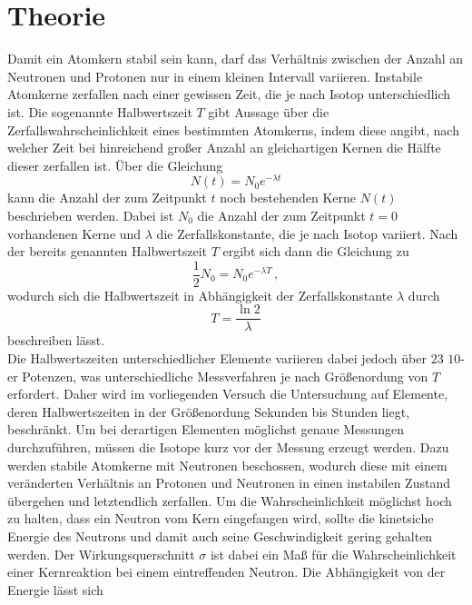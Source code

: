 \section{Theorie}
\label{sec:Theorie}

Damit ein Atomkern stabil sein kann, darf das Verhältnis zwischen der Anzahl an Neutronen und Protonen nur in einem 
kleinen Intervall variieren. Instabile Atomkerne zerfallen nach einer gewissen Zeit, die je nach Isotop unterschiedlich ist.
Die sogenannte Halbwertszeit $T$ gibt Aussage über die Zerfallswahrscheinlichkeit eines bestimmten Atomkerns, indem diese angibt,
nach welcher Zeit bei hinreichend großer Anzahl an gleichartigen Kernen die Hälfte dieser zerfallen ist. Über die Gleichung 
\begin{equation}
    N(t) = N_0 e^{-\lambda t}
    \label{eqn:nt}
\end{equation}
kann die Anzahl der zum Zeitpunkt $t$ noch bestehenden Kerne $N(t)$ beschrieben werden. Dabei ist $N_0$ die Anzahl der zum 
Zeitpunkt $t=0$ vorhandenen Kerne und $\lambda$ die Zerfallskonstante, die je nach Isotop variiert. Nach der bereits genannten 
Halbwertszeit $T$ ergibt sich dann die Gleichung zu 
\begin{equation}
    \frac{1}{2}N_0 = N_0 e^{-\lambda T}\,,
\end{equation}
wodurch sich die Halbwertszeit in Abhängigkeit der Zerfallskonstante $\lambda$ durch 
\begin{equation}
    T = \frac{\ln{2}}{\lambda}
    \label{eqn:T}
\end{equation}
beschreiben lässt.
\\
Die Halbwertszeiten unterschiedlicher Elemente variieren dabei jedoch über $23$ $10$-er Potenzen, was unterschiedliche 
Messverfahren je nach Größenordung von $T$ erfordert. Daher wird im vorliegenden Versuch die Untersuchung auf Elemente, deren 
Halbwertszeiten in der Größenordung Sekunden bis Stunden liegt, beschränkt. Um bei derartigen Elementen möglichst genaue Messungen
durchzuführen, müssen die Isotope kurz vor der Messung erzeugt werden. Dazu werden stabile Atomkerne mit Neutronen beschossen, 
wodurch diese mit einem veränderten Verhältnis an Protonen und Neutronen in einen instabilen Zustand übergehen und letztendlich
zerfallen. Um die Wahrscheinlichkeit möglichst hoch zu halten, dass ein Neutron vom Kern eingefangen wird, sollte die kinetsiche
Energie des Neutrons und damit auch seine Geschwindigkeit gering gehalten werden. Der Wirkungsquerschnitt $\sigma$ ist dabei ein
Maß für die Wahrscheinlichkeit einer Kernreaktion bei einem eintreffenden Neutron. Die Abhängigkeit von der Energie lässt sich 

